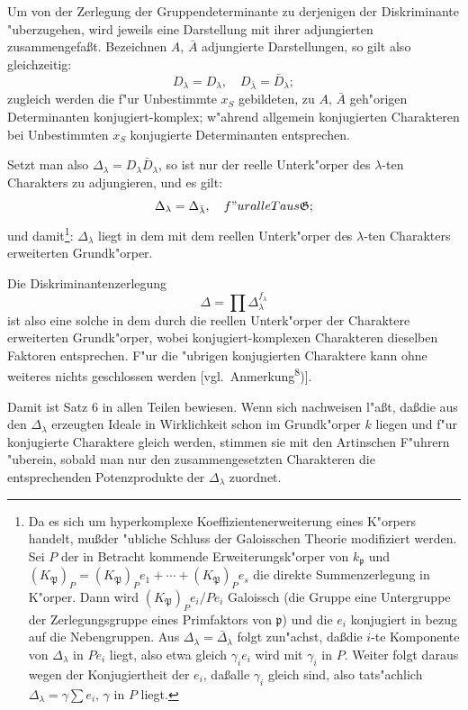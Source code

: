 \documentclass[12pt,a4paper]{article}
\theoremstyle{plain}
\begin{document}
Um von der Zerlegung der Gruppendeterminante zu derjenigen der Diskriminante "uberzugehen, wird jeweils eine Darstellung mit ihrer adjungierten zusammengefa\ss t. Bezeichnen $A$, $\bar{A}$ adjungierte Darstellungen, so gilt also gleichzeitig:
\[
D_\lambda = D_\lambda,\quad D_{\bar{\lambda}} = \bar{D}_\lambda;
\]
zugleich werden die f"ur Unbestimmte $x_S$ gebildeten, zu $A$, $\bar{A}$ geh"origen Determinanten konjugiert-komplex; w"ahrend allgemein konjugierten Charakteren bei Unbestimmten $x_S$ konjugierte Determinanten entsprechen.

Setzt man also $\Delta_\lambda = D_\lambda \bar{D}_\lambda$, so ist nur der reelle Unterk"orper des $\lambda$-ten Charakters zu adjungieren, und es gilt:
\[
\Delta_\lambda = \Delta_{\bar{\lambda}},\quad{f"ur alle } T { aus } \mathfrak{G};
\]
und damit\footnote{Da es sich um hyperkomplexe Koeffizientenerweiterung eines K"orpers handelt, mu\ss der "ubliche Schluss der Galoisschen Theorie modifiziert werden. Sei $P$ der in Betracht kommende Erweiterungsk"orper von $k_\mathfrak{p}$ und $(K_\mathfrak{P})_P = (K_\mathfrak{P})_P e_1 + \cdots + (K_\mathfrak{P})_P e_s$ die direkte Summenzerlegung in K"orper. Dann wird $(K_\mathfrak{P})_P e_i/P e_i$ Galoissch (die Gruppe eine Untergruppe der Zerlegungsgruppe eines Primfaktors von $\mathfrak{p}$) und die $e_i$ konjugiert in bezug auf die Nebengruppen. Aus $\Delta_\lambda = \bar{\Delta}_\lambda$ folgt zun"achst, da\ss die $i$-te Komponente von $\Delta_\lambda$ in $P e_i$ liegt, also etwa gleich $\gamma_i e_i$ wird mit $\gamma_i$ in $P$. Weiter folgt daraus wegen der Konjugiertheit der $e_i$, da\ss alle $\gamma_i$ gleich sind, also tats"achlich $\Delta_\lambda = \gamma \sum e_i$, $\gamma$ in $P$ liegt.}: $\Delta_\lambda$ liegt in dem mit dem reellen Unterk"orper des $\lambda$-ten Charakters erweiterten Grundk"orper.

Die Diskriminantenzerlegung
\[
\Delta = \prod \Delta_\lambda^{f_\lambda}
\]
ist also eine solche in dem durch die reellen Unterk"orper der Charaktere erweiterten Grundk"orper, wobei konjugiert-komplexen Charakteren dieselben Faktoren entsprechen. F"ur die "ubrigen konjugierten Charaktere kann ohne weiteres nichts geschlossen werden [vgl.\ Anmerkung\textsuperscript{8})].

Damit ist Satz 6 in allen Teilen bewiesen. Wenn sich nachweisen l"a\ss t, da\ss die aus den $\Delta_\lambda$ erzeugten Ideale in Wirklichkeit schon im Grundk"orper $k$ liegen und f"ur konjugierte Charaktere gleich werden, stimmen sie mit den Artinschen F"uhrern "uberein, sobald man nur den zusammengesetzten Charakteren die entsprechenden Potenzprodukte der $\Delta_\lambda$ zuordnet.
\end{document}
